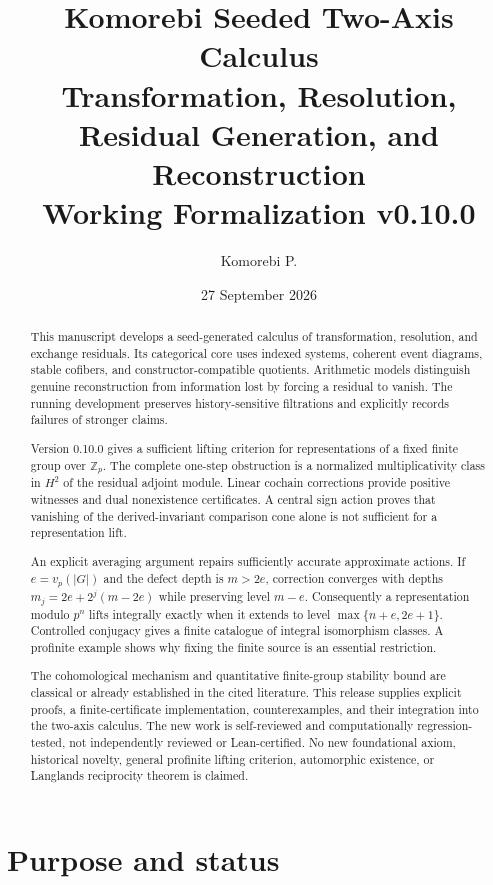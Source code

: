 \documentclass[11pt]{article}
\title{\textbf{Komorebi Seeded Two-Axis Calculus}\\
\large Transformation, Resolution, Residual Generation, and Reconstruction\\[0.4em]
\normalsize Working Formalization v0.10.0}
\author{Komorebi P.}
\date{27 September 2026}
\theoremstyle{definition}
\theoremstyle{remark}
\begin{document}
\maketitle

\begin{abstract}
This manuscript develops a seed-generated calculus of transformation, resolution, and exchange residuals. Its categorical core uses indexed systems, coherent event diagrams, stable cofibers, and constructor-compatible quotients. Arithmetic models distinguish genuine reconstruction from information lost by forcing a residual to vanish. The running development preserves history-sensitive filtrations and explicitly records failures of stronger claims.

Version 0.10.0 gives a sufficient lifting criterion for representations of a fixed finite group over $\mathbb Z_p$. The complete one-step obstruction is a normalized multiplicativity class in $H^2$ of the residual adjoint module. Linear cochain corrections provide positive witnesses and dual nonexistence certificates. A central sign action proves that vanishing of the derived-invariant comparison cone alone is not sufficient for a representation lift.

An explicit averaging argument repairs sufficiently accurate approximate actions. If $e=v_p(|G|)$ and the defect depth is $m>2e$, correction converges with depths $m_j=2e+2^j(m-2e)$ while preserving level $m-e$. Consequently a representation modulo $p^n$ lifts integrally exactly when it extends to level $\max\{n+e,2e+1\}$. Controlled conjugacy gives a finite catalogue of integral isomorphism classes. A profinite example shows why fixing the finite source is an essential restriction.

The cohomological mechanism and quantitative finite-group stability bound are classical or already established in the cited literature. This release supplies explicit proofs, a finite-certificate implementation, counterexamples, and their integration into the two-axis calculus. The new work is self-reviewed and computationally regression-tested, not independently reviewed or Lean-certified. No new foundational axiom, historical novelty, general profinite lifting criterion, automorphic existence, or Langlands reciprocity theorem is claimed.
\end{abstract}
\newpage

\begingroup\small\tableofcontents\endgroup
\newpage

\section{Purpose and status}
\end{document}
